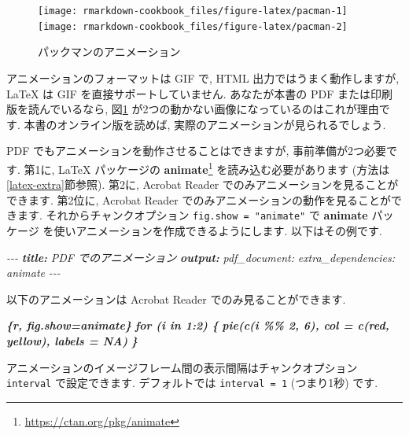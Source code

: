 \documentclass[
  11pt,
]{bxjsreport}
\newenvironment{Shaded}{\begin{snugshade}}{\end{snugshade}}
\newcommand{\AnnotationTok}[1]{\textcolor[rgb]{0.56,0.35,0.01}{\textbf{\textit{#1}}}}
\newcommand{\CommentTok}[1]{\textcolor[rgb]{0.56,0.35,0.01}{\textit{#1}}}
\newcommand{\InformationTok}[1]{\textcolor[rgb]{0.56,0.35,0.01}{\textbf{\textit{#1}}}}
\newcommand{\NormalTok}[1]{#1}
\renewcommand{\href}[2]{#2\footnote{\url{#1}}}
\begin{document}
\begin{figure}

{\centering \texttt{[image: rmarkdown-cookbook\_files/figure-latex/pacman-1]} \texttt{[image: rmarkdown-cookbook\_files/figure-latex/pacman-2]} 

}

\caption{パックマンのアニメーション}\label{fig:pacman}
\end{figure}

アニメーションのフォーマットは GIF で, HTML 出力ではうまく動作しますが, LaTeX は GIF を直接サポートしていません. あなたが本書の PDF または印刷版を読んでいるなら, 図\ref{fig:pacman} が2つの動かない画像になっているのはこれが理由です. 本書のオンライン版を読めば, 実際のアニメーションが見られるでしょう.

PDF でもアニメーションを動作させることはできますが, 事前準備が2つ必要です. 第1に, LaTeX パッケージの \href{https://ctan.org/pkg/animate}{\textbf{animate}} を読み込む必要があります (方法は\ref{latex-extra}節参照). 第2に, Acrobat Reader でのみアニメーションを見ることができます. 第2位に, Acrobat Reader でのみアニメーションの動作を見ることができます. それからチャンクオプション \texttt{fig.show = "animate"} で \textbf{animate} パッケージ を使いアニメーションを作成できるようにします. 以下はその例です.

\begin{Shaded}
\begin{Highlighting}[]
\CommentTok{{-}{-}{-}}
\AnnotationTok{title:}\CommentTok{ PDF でのアニメーション}
\AnnotationTok{output:}
\CommentTok{  pdf\_document:}
\CommentTok{    extra\_dependencies: animate}
\CommentTok{{-}{-}{-}}

\NormalTok{以下のアニメーションは Acrobat Reader でのみ見ることができます.}

\InformationTok{\textasciigrave{}\textasciigrave{}\textasciigrave{}\{r, fig.show=\textquotesingle{}animate\textquotesingle{}\}}
\InformationTok{for (i in 1:2) \{}
\InformationTok{  pie(c(i \%\% 2, 6), col = c(\textquotesingle{}red\textquotesingle{}, \textquotesingle{}yellow\textquotesingle{}), labels = NA)}
\InformationTok{\}}
\InformationTok{\textasciigrave{}\textasciigrave{}\textasciigrave{}}
\end{Highlighting}
\end{Shaded}

アニメーションのイメージフレーム間の表示間隔はチャンクオプション \texttt{interval} で設定できます. デフォルトでは \texttt{interval = 1} (つまり1秒) です.
\end{document}
